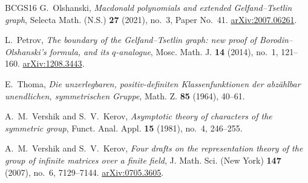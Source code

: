 \documentclass[11pt,reqno]{amsart}
\theoremstyle{definition}
\theoremstyle{remark}
\numberwithin{equation}{section}
\begin{document}
\begin{thebibliography}{BCGS16}
G.~Olshanski,
\emph{Macdonald polynomials and extended Gelfand--Tsetlin graph},
Selecta Math. (N.S.) \textbf{27} (2021), no.~3, Paper No.~41.
\href{https://arxiv.org/abs/2007.06261}{arXiv:2007.06261}.

L.~Petrov,
\emph{The boundary of the Gelfand--Tsetlin graph: new proof of
Borodin--Olshanski's formula, and its $q$-analogue},
Mosc. Math. J. \textbf{14} (2014), no.~1, 121--160.
\href{https://arxiv.org/abs/1208.3443}{arXiv:1208.3443}.

E.~Thoma,
\emph{Die unzerlegbaren, positiv-definiten Klassenfunktionen der abz\"ahlbar
unendlichen, symmetrischen Gruppe},
Math. Z. \textbf{85} (1964), 40--61.

A.~M.~Vershik and S.~V.~Kerov,
\emph{Asymptotic theory of characters of the symmetric group},
Funct. Anal. Appl. \textbf{15} (1981), no.~4, 246--255.

A.~M.~Vershik and S.~V.~Kerov,
\emph{Four drafts on the representation theory of the group of infinite
matrices over a finite field},
J. Math. Sci. (New York) \textbf{147} (2007), no.~6, 7129--7144.
\href{https://arxiv.org/abs/0705.3605}{arXiv:0705.3605}.

\end{thebibliography}
\end{document}
